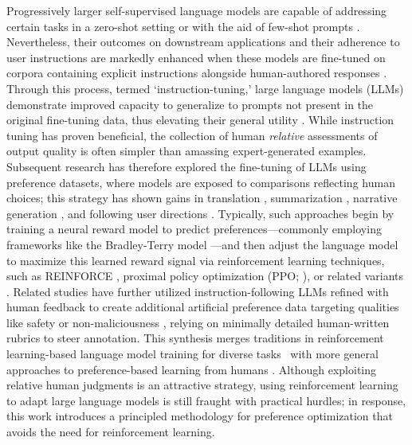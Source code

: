 Progressively larger self-supervised language models are capable of addressing certain tasks in a zero-shot setting \citep{radford2019language} or with the aid of few-shot prompts \citep{gpt3,megatron,chowdhery2022palm}. Nevertheless, their outcomes on downstream applications and their adherence to user instructions are markedly enhanced when these models are fine-tuned on corpora containing explicit instructions alongside human-authored responses \citep{mishra-etal-2022-cross,sanh2022multitask,chung2022scaling,thoppilan2022lamda}. Through this process, termed `instruction-tuning,' large language models (LLMs) demonstrate improved capacity to generalize to prompts not present in the original fine-tuning data, thus elevating their general utility \citep{chung2022scaling}. While instruction tuning has proven beneficial, the collection of human \textit{relative} assessments of output quality is often simpler than amassing expert-generated examples. Subsequent research has therefore explored the fine-tuning of LLMs using preference datasets, where models are exposed to comparisons reflecting human choices; this strategy has shown gains in translation \citep{kreutzer-etal-2018-reliability}, summarization \citep{stiennon2022learning,ziegler2020finetuning}, narrative generation \citep{ziegler2020finetuning}, and following user directions \citep{ouyang2022training,ramamurthy2023is}. Typically, such approaches begin by training a neural reward model to predict preferences—commonly employing frameworks like the Bradley-Terry model \citep{bradley1952rankanalysis}—and then adjust the language model to maximize this learned reward signal via reinforcement learning techniques, such as REINFORCE \citep{williams1992reinforce}, proximal policy optimization (PPO; \cite{schulman2017proximal}), or related variants \citep{ramamurthy2023is}. Related studies have further utilized instruction-following LLMs refined with human feedback to create additional artificial preference data targeting qualities like safety or non-maliciousness \citep{bai2022constitutional}, relying on minimally detailed human-written rubrics to steer annotation. This synthesis merges traditions in reinforcement learning-based language model training for diverse tasks~\citep{Ranzato2015SequenceLT,paulus2018a,wu2018learning} with more general approaches to preference-based learning from humans \citep{christiano2017deep,kupcsik2018learning}. Although exploiting relative human judgments is an attractive strategy, using reinforcement learning to adapt large language models is still fraught with practical hurdles; in response, this work introduces a principled methodology for preference optimization that avoids the need for reinforcement learning.


